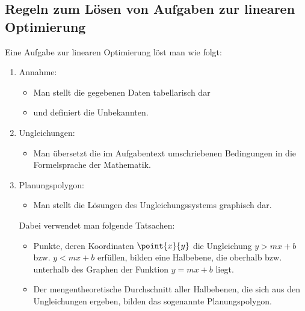 \documentclass[%
11pt,%
twoside,%
titlepage,%
german,%
headsepline%
]{scrartcl}
\begin{document}
\subsection{Regeln zum L\"osen von Aufgaben zur linearen Optimierung}
Eine Aufgabe zur linearen Optimierung l\"ost man wie folgt:

\begin{enumerate}
  \item Annahme:
  \begin{itemize}
    \item Man stellt die gegebenen Daten tabellarisch dar
    \item und definiert die Unbekannten.
  \end{itemize}
  \item Ungleichungen:
  \begin{itemize}
    \item Man \"ubersetzt die im Aufgabentext umschriebenen
    Bedingungen in die Formelsprache der Mathematik.
  \end{itemize}
  \item Planungspolygon:
  \begin{itemize}
    \item Man stellt die L\"osungen des Ungleichungssystems graphisch
    dar.
  \end{itemize}
  Dabei verwendet man folgende Tatsachen:
  \begin{itemize}
    \item Punkte, deren Koordinaten $\point{x}{y}$ die Ungleichung $y>mx+b$
    bzw. $y<mx+b$ erf\"ullen, bilden eine Halbebene, die oberhalb bzw.
    unterhalb des Graphen der Funktion $y=mx+b$ liegt.
    \item Der mengentheoretische Durchschnitt aller Halbebenen, die
    sich aus den Ungleichungen ergeben, bilden das sogenannte
    Planungspolygon.
  \end{itemize}
  
  \pagebreak
  

\end{enumerate}
\end{document}
